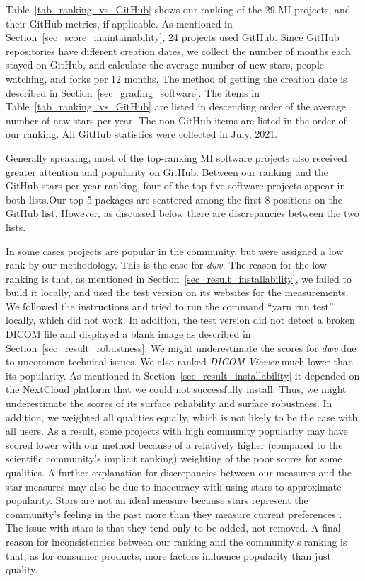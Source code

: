 \documentclass[final, 3p, times, authoryear]{elsarticle}
\begin{document}
Table~\ref{tab_ranking_vs_GitHub} shows our ranking of the 29 MI projects, and
their GitHub metrics, if applicable. As mentioned in
Section~\ref{sec_score_maintainability}, 24 projects used GitHub. Since GitHub
repositories have different creation dates, we collect the number of months each
stayed on GitHub, and calculate the average number of new stars, people
watching, and forks per 12 months. The method of getting the creation date is
described in Section~\ref{sec_grading_software}.  The items in
Table~\ref{tab_ranking_vs_GitHub} are listed in descending order of the average
number of new stars per year.  The non-GitHub items are listed in the order of
our ranking.  All GitHub statistics were collected in July, 2021.  

Generally speaking, most of the top-ranking MI software projects also received
greater attention and popularity on GitHub. Between our ranking and the GitHub
stars-per-year ranking, four of the top five software projects appear in both
lists.Our top 5 packages are scattered among the first 8 positions on the GitHub
list. However, as discussed below there are discrepancies between the two lists.

In some cases projects are popular in the community, but were assigned a low
rank by our methodology.  This is the case for \textit{dwv}. The reason for the
low ranking is that, as mentioned in Section~\ref{sec_result_installability}, we
failed to build it locally, and used the test version on its websites for the
measurements. We followed the instructions and tried to run the command ``yarn
run test'' locally, which did not work. In addition, the test version did not
detect a broken DICOM file and displayed a blank image as described in
Section~\ref{sec_result_robustness}. We might underestimate the scores for
\textit{dwv} due to uncommon technical issues. We also ranked \textit{DICOM
Viewer} much lower than its popularity. As mentioned in
Section~\ref{sec_result_installability} it depended on the NextCloud platform
that we could not successfully install. Thus, we might underestimate the scores
of its surface reliability and surface robustness. In addition, we weighted all
qualities equally, which is not likely to be the case with all users. As a
result, some projects with high community popularity may have scored lower with
our method because of a relatively higher (compared to the scientific
community's implicit ranking) weighting of the poor scores for some qualities. A
further explanation for discrepancies between our measures and the star measures
may also be due to inaccuracy with using stars to approximate popularity.  Stars
are not an ideal measure because stars represent the community's feeling in the
past more than they measure current preferences \citep{Szulik2017}.  The issue
with stars is that they tend only to be added, not removed.  A final reason for
inconsistencies between our ranking and the community's ranking is that, as for
consumer products, more factors influence popularity than just quality.
\end{document}
